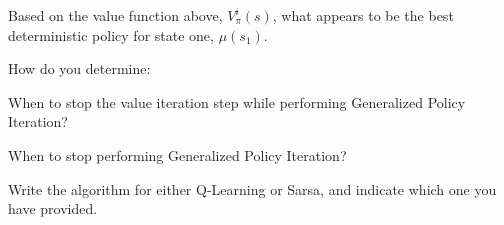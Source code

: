 \documentclass[12pt]{exam}
\newif\ifanswers
\begin{document}
\begin{question}{30}
\begin{subquestion}
  \begin{minipage}[t][1in]{\linewidth}
    \ifanswers
    Put answer here
    \fi
  \end{minipage}
  \end{subquestion}

  \begin{subquestion}
  Based on the value function above, $V^{i}_\pi(s)$, what appears to be the best deterministic policy for state one, $\mu(s_1)$.
  
  \begin{minipage}[t][1in]{\linewidth}
    \ifanswers
    Put answer here
    \fi
  \end{minipage}
  \end{subquestion}

  
\end{question}



\begin{question}{10} How do you determine:
  \begin{subquestion}
    When to stop the value iteration step while performing Generalized Policy Iteration?
  \end{subquestion}
  \begin{minipage}[t][1in]{\linewidth}
  \end{minipage}
  \begin{subquestion}
  When to stop performing  Generalized Policy Iteration?
  \end{subquestion}
  \begin{minipage}[t][1in]{\linewidth}
  \end{minipage}
  
  
\end{question}

 \begin{question}{30} 
   Write the algorithm for either Q-Learning or Sarsa, and indicate which one you have provided.

       \begin{minipage}[t][5in]{\linewidth}
         \ifanswers
         Put answer here
         \fi
       \end{minipage}

   \end{question}
\end{document}
